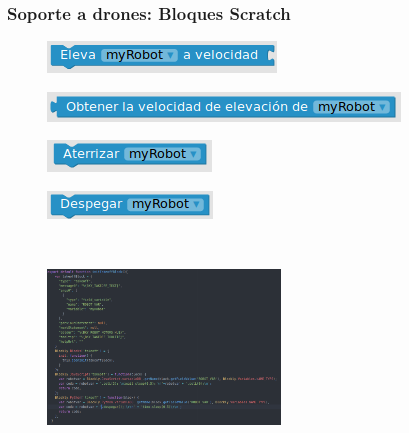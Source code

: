 \documentclass[xcolor={table}]{beamer}
\begin{document}
		\begin{frame}
		\frametitle{Soporte a drones: Bloques Scratch}
		 \begin{minipage}{.45\textwidth}
		       \begin{figure}[H]
            \centering
            \includegraphics[scale=0.5]{img/ascensionBlockly.png}
           \label{fig:ascension}
            \end{figure}
                 \begin{figure}[H]
            \centering
            \includegraphics[scale=0.4]{img/verticalBlockly.png}
           \label{fig:vertical}
            \end{figure}
            \begin{figure}[H]
            \centering
            \includegraphics[scale=0.48]{img/aterrizarBlockly.png}
           \label{fig:vertica}
            \end{figure}
               \begin{figure}[H]
            \centering
            \includegraphics[scale=0.5]{img/despegarBlockly.png}
           \label{fig:vertica}
            \end{figure}
                        \end{minipage}
            \begin{minipage}{.48\textwidth}
            \begin{figure}
                \centering                   \includegraphics[width=6.2cm, height=5.8cm]{img/traduccionDespegar.png}
                \label{fig:traduccion}
            \end{figure}
            \end{minipage}
		\end{frame}
		
\end{document}
